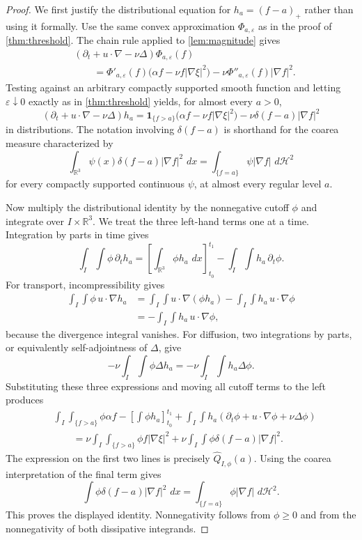 \documentclass[11pt]{article}
\theoremstyle{definition}\newtheorem{definition}[theorem]{Definition}
\theoremstyle{remark}\newtheorem{remark}[theorem]{Remark}
\newcommand{\R}{\mathbb R}\newcommand{\dd}{\,d}\newcommand{\HH}{\mathcal H}
\newcommand{\Qhat}{\widehat Q}\newcommand{\Qp}{\widehat{\mathfrak Q}}
\begin{document}
\begin{proof}
We first justify the distributional equation for $h_a=(f-a)_+$ rather than
using it formally.  Use the same convex approximation
$\Phi_{a,\varepsilon}$ as in the proof of \cref{thm:threshold}.  The chain
rule applied to \cref{lem:magnitude} gives
\[
\begin{aligned}
&(\partial_t+u\cdot\nabla-\nu\Delta)\Phi_{a,\varepsilon}(f)\\
&\qquad=
\Phi'_{a,\varepsilon}(f)
\bigl(\alpha f-\nu f|\nabla\xi|^2\bigr)
-\nu\Phi''_{a,\varepsilon}(f)|\nabla f|^2.
\end{aligned}
\]
Testing against an arbitrary compactly supported smooth function and letting
$\varepsilon\downarrow0$ exactly as in \cref{thm:threshold} yields, for
almost every $a>0$,
\[
(\partial_t+u\cdot\nabla-\nu\Delta)h_a
=
\mathbf1_{\{f>a\}}
\bigl(\alpha f-\nu f|\nabla\xi|^2\bigr)
-\nu\delta(f-a)|\nabla f|^2
\]
in distributions.  The notation involving $\delta(f-a)$ is shorthand for
the coarea measure characterized by
\[
\int_{\R^3}\psi(x)\delta(f-a)|\nabla f|^2\,\dd x
=
\int_{\{f=a\}}\psi|\nabla f|\,\dd\HH^2
\]
for every compactly supported continuous $\psi$, at almost every regular
level $a$.

Now multiply the distributional identity by the nonnegative cutoff $\phi$
and integrate over $I\times\R^3$.  We treat the three left-hand terms one at
a time.  Integration by parts in time gives
\[
\int_I\int\phi\,\partial_t h_a
=
\left[\int_{\R^3}\phi h_a\,\dd x\right]_{t_0}^{t_1}
-\int_I\int h_a\,\partial_t\phi.
\]
For transport, incompressibility gives
\[
\begin{aligned}
\int_I\int\phi\,u\cdot\nabla h_a
&=\int_I\int u\cdot\nabla(\phi h_a)
-\int_I\int h_a\,u\cdot\nabla\phi\\
&=-\int_I\int h_a\,u\cdot\nabla\phi,
\end{aligned}
\]
because the divergence integral vanishes.  For diffusion, two integrations
by parts, or equivalently self-adjointness of $\Delta$, give
\[
-\nu\int_I\int\phi\Delta h_a
=-\nu\int_I\int h_a\Delta\phi.
\]
Substituting these three expressions and moving all cutoff terms to the left
produces
\[
\begin{aligned}
&\int_I\int_{\{f>a\}}\phi\alpha f
-\left[\int\phi h_a\right]_{t_0}^{t_1}
+\int_I\int h_a
(\partial_t\phi+u\cdot\nabla\phi+\nu\Delta\phi)\\
&\qquad=
\nu\int_I\int_{\{f>a\}}\phi f|\nabla\xi|^2
+\nu\int_I\int\phi\delta(f-a)|\nabla f|^2.
\end{aligned}
\]
The expression on the first two lines is precisely
$\Qhat_{I,\phi}(a)$.  Using the coarea interpretation of the final term gives
\[
\int\phi\delta(f-a)|\nabla f|^2\,\dd x
=
\int_{\{f=a\}}\phi|\nabla f|\,\dd\HH^2.
\]
This proves the displayed identity.  Nonnegativity follows from
$\phi\ge0$ and from the nonnegativity of both dissipative integrands.
\end{proof}
\end{document}

